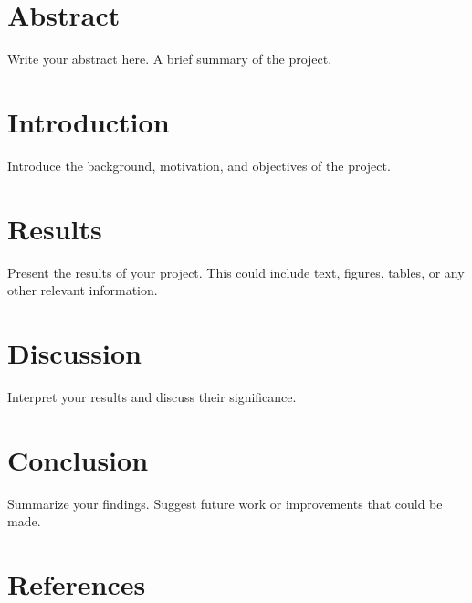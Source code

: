 \documentclass[a4paper,12pt]{article}  %
\begin{document}

\section{Abstract}
Write your abstract here. A brief summary of the project. \cite{einstein1905}

\section{Introduction}
Introduce the background, motivation, and objectives of the project.



\section{Results}
Present the results of your project. This could include text, figures, tables, or any other relevant information.

\section{Discussion}
Interpret your results and discuss their significance.

\section{Conclusion}
Summarize your findings. Suggest future work or improvements that could be made.

\section*{References}  %
\printbibliography    %

\end{document}

